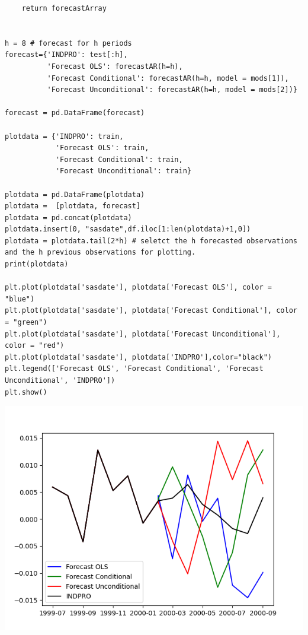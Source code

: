 \documentclass{article}
\begin{document}
\begin{verbatim}
    return forecastArray


h = 8 # forecast for h periods
forecast={'INDPRO': test[:h], 
          'Forecast OLS': forecastAR(h=h), 
          'Forecast Conditional': forecastAR(h=h, model = mods[1]),
          'Forecast Unconditional': forecastAR(h=h, model = mods[2])}

forecast = pd.DataFrame(forecast)

plotdata = {'INDPRO': train, 
            'Forecast OLS': train, 
            'Forecast Conditional': train,
            'Forecast Unconditional': train}

plotdata = pd.DataFrame(plotdata)
plotdata =  [plotdata, forecast]
plotdata = pd.concat(plotdata)
plotdata.insert(0, "sasdate",df.iloc[1:len(plotdata)+1,0])
plotdata = plotdata.tail(2*h) # seletct the h forecasted observations and the h previous observations for plotting.
print(plotdata)

plt.plot(plotdata['sasdate'], plotdata['Forecast OLS'], color = "blue")
plt.plot(plotdata['sasdate'], plotdata['Forecast Conditional'], color = "green")
plt.plot(plotdata['sasdate'], plotdata['Forecast Unconditional'], color = "red")
plt.plot(plotdata['sasdate'], plotdata['INDPRO'],color="black")
plt.legend(['Forecast OLS', 'Forecast Conditional', 'Forecast Unconditional', 'INDPRO'])
plt.show()
\end{verbatim}

\includegraphics{Figure.png}
\end{document}
